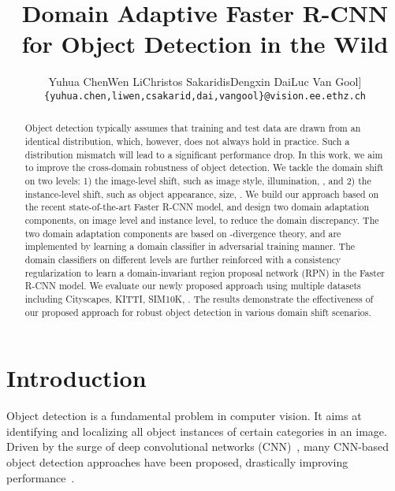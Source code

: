 \documentclass[10pt,twocolumn,letterpaper]{article}
\begin{document}
\title{Domain Adaptive Faster R-CNN for Object Detection in the Wild}

\author{Yuhua Chen\hspace{5mm}Wen Li\hspace{5mm}Christos Sakaridis\hspace{5mm}Dengxin Dai\hspace{5mm}Luc Van Gool\-1.5pt]
{\tt\small \{yuhua.chen,liwen,csakarid,dai,vangool\}@vision.ee.ethz.ch}
}

\maketitle


\begin{abstract}
Object detection typically assumes that training and test data are drawn from an identical distribution, which, however, does not always hold in practice. Such a distribution mismatch will lead to a significant performance drop. In this work, we aim to improve the cross-domain robustness of object detection. We tackle the domain shift on two levels: 1) the image-level shift, such as image style, illumination, \etc, and 2) the instance-level shift, such as object appearance, size, \etc. We build our approach based on the recent state-of-the-art Faster R-CNN model, and design two domain adaptation components, on image level and instance level, to reduce the domain discrepancy. The two domain adaptation components are based on -divergence theory, and are implemented by learning a domain classifier in adversarial training manner. The domain classifiers on different levels are further reinforced with a consistency regularization to learn a domain-invariant region proposal network (RPN) in the Faster R-CNN model. We evaluate our newly proposed approach using multiple datasets including Cityscapes, KITTI, SIM10K, \etc. The results demonstrate the effectiveness of our proposed approach for robust object detection in various domain shift scenarios.
\end{abstract}

\section{Introduction}
\label{sec:intro}
Object detection is a fundamental problem in computer vision. It aims at identifying and localizing all object instances of certain categories in an image. Driven by the surge of deep convolutional networks (CNN)~\cite{krizhevsky2012imagenet}, many CNN-based object detection approaches have been proposed, drastically improving performance~\cite{girshick2014rich,sermanet2013overfeat,girshick2015fast,li2016r,gidaris2015object,liu2016ssd}.
\end{document}
